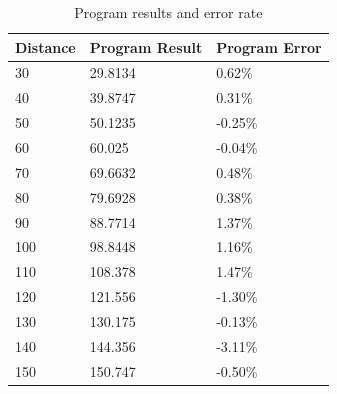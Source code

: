 \documentclass[conference]{IEEEtran}
\begin{document}
\begin{table}[]
\caption{Program results and error rate}
\label{tab:t4_partial}
\begin{tabular}{|l|l|l|}
\hline
\textbf{Distance} & \textbf{Program Result} & \textbf{Program Error} \\ \hline
30                & 29.8134                 & 0.62\%                 \\ \hline
40                & 39.8747                 & 0.31\%                 \\ \hline
50                & 50.1235                 & -0.25\%                \\ \hline
60                & 60.025                  & -0.04\%                \\ \hline
70                & 69.6632                 & 0.48\%                 \\ \hline
80                & 79.6928                 & 0.38\%                 \\ \hline
90                & 88.7714                 & 1.37\%                 \\ \hline
100               & 98.8448                 & 1.16\%                 \\ \hline
110               & 108.378                 & 1.47\%                 \\ \hline
120               & 121.556                 & -1.30\%                \\ \hline
130               & 130.175                 & -0.13\%                \\ \hline
140               & 144.356                 & -3.11\%                \\ \hline
150               & 150.747                 & -0.50\%                \\	\hline
\end{tabular}
\end{table}
\end{document}
